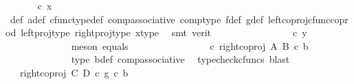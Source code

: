 \begin{isabellebody}
\ \isamarkupfalse%
\ {\isachardoublequoteopen}{\isachardot}{\kern0pt}{\isachardot}{\kern0pt}{\isachardot}{\kern0pt}\ \ {\isacharequal}{\kern0pt}\ {\isasymphi}\ {\isasymcirc}\isactrlsub c\ x{\isachardoublequoteclose}\isanewline
\ \ \ \ \ \ \ \ \ \ \ \ \ \ \isamarkupfalse%
\ {\isasymphi}{\isacharunderscore}{\kern0pt}def\ a{\isacharunderscore}{\kern0pt}def\ cfunc{\isacharunderscore}{\kern0pt}type{\isacharunderscore}{\kern0pt}def\ comp{\isacharunderscore}{\kern0pt}associative\ comp{\isacharunderscore}{\kern0pt}type\ f{\isacharunderscore}{\kern0pt}def\ g{\isacharunderscore}{\kern0pt}def\ left{\isacharunderscore}{\kern0pt}coproj{\isacharunderscore}{\kern0pt}cfunc{\isacharunderscore}{\kern0pt}coprod\ left{\isacharunderscore}{\kern0pt}proj{\isacharunderscore}{\kern0pt}type\ right{\isacharunderscore}{\kern0pt}proj{\isacharunderscore}{\kern0pt}type\ x{\isacharunderscore}{\kern0pt}type\ \isamarkupfalse%
\ {\isacharparenleft}{\kern0pt}smt\ {\isacharparenleft}{\kern0pt}verit{\isacharparenright}{\kern0pt}{\isacharparenright}{\kern0pt}\isanewline
\ \ \ \ \ \ \ \ \ \ \isamarkupfalse%
\ \isamarkupfalse%
\ {\isachardoublequoteopen}{\isachardot}{\kern0pt}{\isachardot}{\kern0pt}{\isachardot}{\kern0pt}\ {\isacharequal}{\kern0pt}\ {\isasymphi}\ {\isasymcirc}\isactrlsub c\ y{\isachardoublequoteclose}\isanewline
\ \ \ \ \ \ \ \ \ \ \ \ \isamarkupfalse%
\ {\isacharparenleft}{\kern0pt}meson\ equals{\isacharparenright}{\kern0pt}\isanewline
\ \ \ \ \ \ \ \ \ \ \isamarkupfalse%
\ \isamarkupfalse%
\ {\isachardoublequoteopen}{\isachardot}{\kern0pt}{\isachardot}{\kern0pt}{\isachardot}{\kern0pt}\ {\isacharequal}{\kern0pt}\ {\isacharparenleft}{\kern0pt}{\isasymphi}\ {\isasymcirc}\isactrlsub c\ right{\isacharunderscore}{\kern0pt}coproj\ A\ B{\isacharparenright}{\kern0pt}\ {\isasymcirc}\isactrlsub c\ b{\isacharprime}{\kern0pt}{\isachardoublequoteclose}\isanewline
\ \ \ \ \ \ \ \ \ \ \ \ \isamarkupfalse%
\ {\isasymphi}{\isacharunderscore}{\kern0pt}type\ b{\isacharprime}{\kern0pt}{\isacharunderscore}{\kern0pt}def\ comp{\isacharunderscore}{\kern0pt}associative{}\ \isamarkupfalse%
\ {\isacharparenleft}{\kern0pt}typecheck{\isacharunderscore}{\kern0pt}cfuncs{\isacharcomma}{\kern0pt}\ blast{\isacharparenright}{\kern0pt}\isanewline
\ \ \ \ \ \ \ \ \ \ \isamarkupfalse%
\ \isamarkupfalse%
\ {\isachardoublequoteopen}{\isachardot}{\kern0pt}{\isachardot}{\kern0pt}{\isachardot}{\kern0pt}\ {\isacharequal}{\kern0pt}\ {\isacharparenleft}{\kern0pt}right{\isacharunderscore}{\kern0pt}coproj\ C\ D\ {\isasymcirc}\isactrlsub c\ g{\isacharparenright}{\kern0pt}\ {\isasymcirc}\isactrlsub c\ b{\isacharprime}{\kern0pt}\ {\isachardoublequoteclose}\isanewline

\end{isabellebody}
